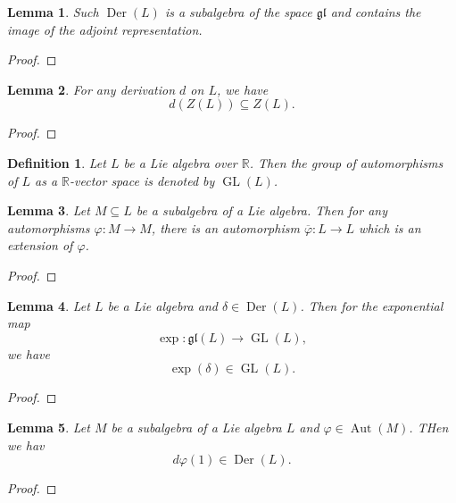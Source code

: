 \documentclass{article}
\newtheorem{definition}{Definition}[section]
\newtheorem{lemma}{Lemma}[section]
\numberwithin{equation}{section}
\DeclareMathOperator{\GL}{GL}
\DeclareMathOperator{\Der}{Der}
\DeclareMathOperator{\Aut}{Aut}
\begin{document}
\begin{lemma}
Such $\Der(L)$ is a subalgebra of the space $\mathfrak{gl}$ and contains the image of the adjoint representation.
\end{lemma}

\begin{proof}
\end{proof}

\begin{lemma}
For any derivation $d$ on $L$, we have
\begin{equation*}
d(Z(L)) \subseteq Z(L).
\end{equation*}
\end{lemma}

\begin{proof}
\end{proof}

\begin{definition}
Let $L$ be a Lie algebra over $\mathbb{R}$. Then the group of automorphisms of $L$ as a $\mathbb{R}$-vector space is denoted by $\GL(L)$.
\end{definition}

\begin{lemma}
Let $M\subseteq L$ be a subalgebra of a Lie algebra. Then for any automorphisms $\varphi:M\to M$, there is an automorphism $\overline{\varphi}:L\to L$ which is an extension of $\varphi$.
\end{lemma}

\begin{proof}
\end{proof}

\begin{lemma}
Let $L$ be a Lie algebra and $\delta\in\Der(L)$. Then for the exponential map
\begin{equation*}
\exp:\mathfrak{gl}(L)\to\GL(L),
\end{equation*}
we have
\begin{equation*}
\exp(\delta)\in \GL(L).
\end{equation*}
\end{lemma}

\begin{proof}
\end{proof}

\begin{lemma}
Let $M$ be a subalgebra of a Lie algebra $L$ and $\varphi\in \Aut(M)$. THen we hav
\begin{equation*}
d\varphi(1)\in\Der(L).
\end{equation*}
\end{lemma}
\begin{proof}
\end{proof}
\end{document}
